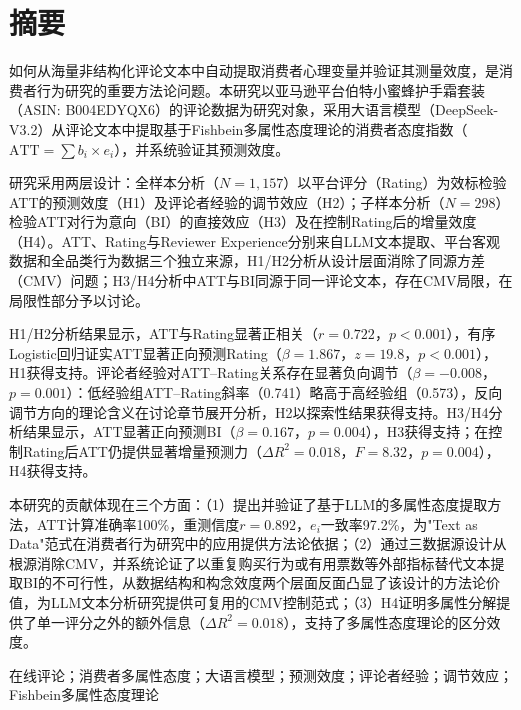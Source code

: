 \thispagestyle{plain}

\section*{摘\quad 要}

{\songti

如何从海量非结构化评论文本中自动提取消费者心理变量并验证其测量效度，是消费者行为研究的重要方法论问题。本研究以亚马逊平台伯特小蜜蜂护手霜套装（ASIN: B004EDYQX6）的评论数据为研究对象，采用大语言模型（DeepSeek-V3.2）从评论文本中提取基于Fishbein多属性态度理论的消费者态度指数（$\text{ATT} = \sum b_i \times e_i$），并系统验证其预测效度。

研究采用两层设计：全样本分析（$N=1{,}157$）以平台评分（Rating）为效标检验ATT的预测效度（H1）及评论者经验的调节效应（H2）；子样本分析（$N=298$）检验ATT对行为意向（BI）的直接效应（H3）及在控制Rating后的增量效度（H4）。ATT、Rating与Reviewer Experience分别来自LLM文本提取、平台客观数据和全品类行为数据三个独立来源，H1/H2分析从设计层面消除了同源方差（CMV）问题；H3/H4分析中ATT与BI同源于同一评论文本，存在CMV局限，在局限性部分予以讨论。

H1/H2分析结果显示，ATT与Rating显著正相关（$r=0.722$，$p<0.001$），有序Logistic回归证实ATT显著正向预测Rating（$\beta=1.867$，$z=19.8$，$p<0.001$），H1获得支持。评论者经验对ATT--Rating关系存在显著负向调节（$\beta=-0.008$，$p=0.001$）：低经验组ATT--Rating斜率（0.741）略高于高经验组（0.573），反向调节方向的理论含义在讨论章节展开分析，H2以探索性结果获得支持。H3/H4分析结果显示，ATT显著正向预测BI（$\beta=0.167$，$p=0.004$），H3获得支持；在控制Rating后ATT仍提供显著增量预测力（$\Delta R^2=0.018$，$F=8.32$，$p=0.004$），H4获得支持。

本研究的贡献体现在三个方面：（1）提出并验证了基于LLM的多属性态度提取方法，ATT计算准确率100\%，重测信度$r=0.892$，$e_i$一致率97.2\%，为"Text as Data"范式在消费者行为研究中的应用提供方法论依据；（2）通过三数据源设计从根源消除CMV，并系统论证了以重复购买行为或有用票数等外部指标替代文本提取BI的不可行性，从数据结构和构念效度两个层面反面凸显了该设计的方法论价值，为LLM文本分析研究提供可复用的CMV控制范式；（3）H4证明多属性分解提供了单一评分之外的额外信息（$\Delta R^2=0.018$），支持了多属性态度理论的区分效度。

\vspace{1em}
在线评论；消费者多属性态度；大语言模型；预测效度；评论者经验；调节效应；Fishbein多属性态度理论
}

\clearpage

